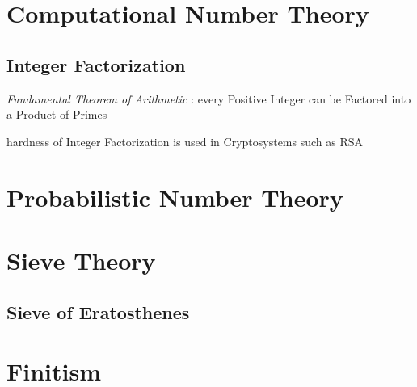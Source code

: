 \section{Computational Number Theory}\label{sec:computational_number_theory}

\subsection{Integer Factorization}\label{sec:integer_factorization}

\emph{Fundamental Theorem of Arithmetic} : every Positive Integer can be
Factored into a Product of Primes

hardness of Integer Factorization is used in Cryptosystems such as RSA



\section{Probabilistic Number Theory}\label{sec:probabilistic_number_theory}

\section{Sieve Theory}\label{sec:sieve_theory}

\subsection{Sieve of Eratosthenes}\label{sec:sieve}



\section{Finitism}\label{sec:finitism}


